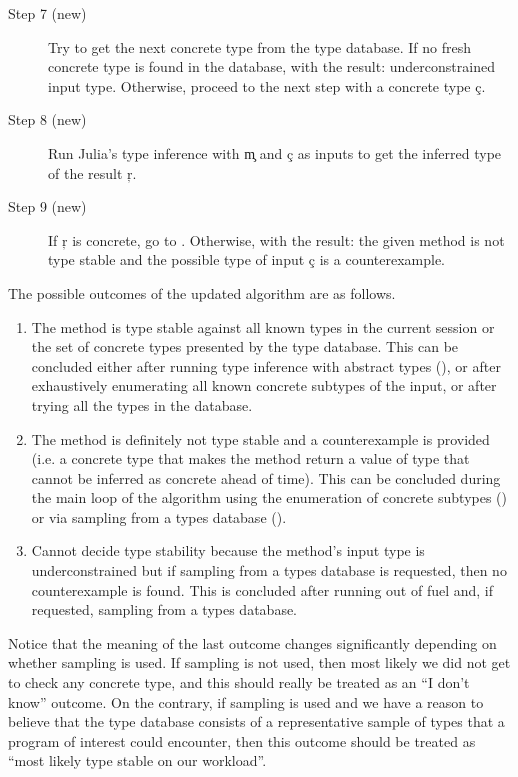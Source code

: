 \begin{description}
  \item[Step 7 (new)]
    Try to get the next concrete type from the type database.
    If no fresh concrete type is found in the database,  with
    the result: underconstrained input type.
    Otherwise, proceed to the next step with a concrete type \c c.
  \item[Step 8 (new)]
    Run Julia’s type inference with \c m and \c c as
    inputs to get the inferred type of the result \c r.
  \item[Step 9 (new)]
    If \c r  is concrete, go to . Otherwise, 
    with the result: the given method is not type stable and the possible type
    of input \c c is a counterexample.
\end{description}

The possible outcomes of the updated algorithm are as follows.
\begin{enumerate}

  \item The method is type stable against all known types in the current session
  or the set of concrete types presented
  by the type database. This can be concluded either after
  running type inference with abstract types
  (), or after exhaustively enumerating all
  known concrete subtypes of the input, or after trying all the types in the database.

  \item The method is definitely not type stable and a counterexample is provided
  (i.e. a
  concrete type that makes the method return a value of type that cannot be
  inferred as concrete ahead of time). This can be concluded during the main
  loop of the algorithm using the enumeration of concrete subtypes
  () or via
  sampling from a types database ().

  \item
  Cannot decide type stability because the method's input type is
  underconstrained but if sampling from a types database is requested, then no
  counterexample is found. This is concluded after running out
  of fuel and, if requested, sampling from a types database.
\end{enumerate}

Notice that the meaning of the last outcome changes significantly depending on whether
sampling is used. If sampling is not used, then most likely we did not get to
check any concrete type, and this should really be treated as an ``I don't know''
outcome. On the contrary, if sampling is used and we have a reason to believe
that the type database consists of a representative sample of types that a
program of interest could encounter, then this outcome should be treated as
``most likely type stable on our workload''.


